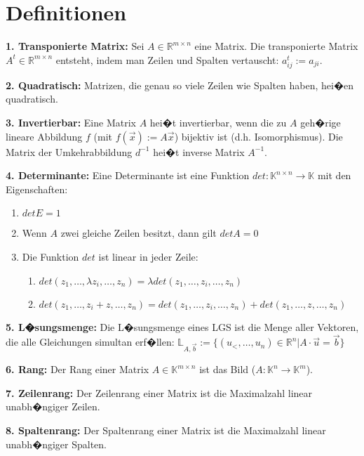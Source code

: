 \small %
\section*{Definitionen}
\textbf{1. Transponierte Matrix:} Sei $A \in \mathbb{R}^{m \times n}$ eine Matrix. Die transponierte Matrix $A^t \in \mathbb{R}^{m \times n}$ entsteht, indem man Zeilen und Spalten vertauscht: $a^t_{ij} := a_{ji}$.

\textbf{2. Quadratisch:} Matrizen, die genau so viele Zeilen wie Spalten haben, hei�en quadratisch.

\textbf{3. Invertierbar:} Eine Matrix $A$ hei�t invertierbar, wenn die zu $A$ geh�rige lineare Abbildung $f$ (mit $f(\vec{x}) := A\vec{x}$) bijektiv ist (d.h. Isomorphismus).
Die Matrix der Umkehrabbildung $d^{-1}$ hei�t inverse Matrix $A^{-1}$.

\textbf{4. Determinante:}  Eine Determinante ist eine Funktion $det: \mathbb{K}^{n \times n} \rightarrow \mathbb{K}$ mit den Eigenschaften:
\begin{enumerate}
  \item $det E = 1$
  \item Wenn $A$ zwei gleiche Zeilen besitzt, dann gilt $det A = 0$
  \item Die Funktion $det$ ist linear in jeder Zeile:
  \begin{enumerate}
    \item $det(z_1,\dots,\lambda z_i,\dots,z_n) = \lambda det(z_1,\dots,z_i,\dots,z_n)$
    \item $det(z_1,\dots,z_i+z,\dots,z_n) = det(z_1,\dots,z_i,\dots,z_n) + det(z_1,\dots,z,\dots,z_n)$
  \end{enumerate}
\end{enumerate}

\textbf{5. L�sungsmenge:} Die L�sungsmenge eines LGS ist die Menge aller Vektoren, die alle Gleichungen simultan erf�llen: $\mathbb{L}_{A,\vec{b}} := \{(u_<, \dots,u_n) \in \mathbb{R}^n | A \cdot \vec{u} = \vec{b}\}$

\textbf{6. Rang:} Der Rang einer Matrix $A \in \mathbb{K}^{m \times n}$ ist das Bild ($A : \mathbb{K}^n \rightarrow \mathbb{K}^m$).

\textbf{7. Zeilenrang:} Der Zeilenrang einer Matrix ist die Maximalzahl linear unabh�ngiger Zeilen.

\textbf{8. Spaltenrang:} Der Spaltenrang einer Matrix ist die Maximalzahl linear unabh�ngiger Spalten.

